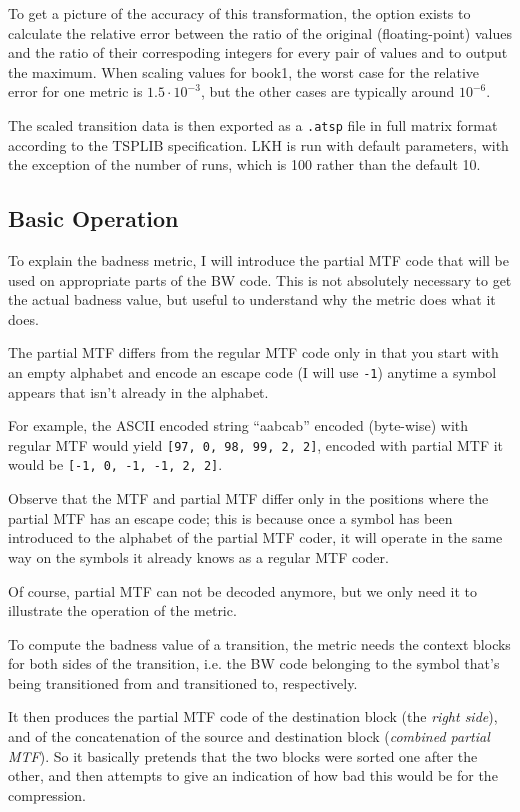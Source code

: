 \documentclass[a4paper]{scrreprt}
\begin{document}
To get a picture of the accuracy of this transformation, the option exists to
calculate the relative error between the ratio of the original (floating-point)
values and the ratio of their correspoding integers for every pair of values and
to output the maximum. When scaling values for book1, the worst case for the
relative error for one metric is \(1.5 \cdot 10^{-3}\), but the other cases are
typically around \(10^{-6}\).

The scaled transition data is then exported as a \texttt{.atsp} file in full
matrix format according to the TSPLIB specification\cite{reinelt1991tsplib}. LKH
is run with default parameters, with the exception of the number of runs, which
is 100 rather than the default 10.

\subsection{Basic Operation}

To explain the badness metric, I will introduce the partial MTF code that will
be used on appropriate parts of the BW code. This is not absolutely necessary to
get the actual badness value, but useful to understand why the metric does what
it does.

The partial MTF differs from the regular MTF code only in that you start with an
empty alphabet and encode an escape code (I will use \texttt{-1}) anytime a
symbol appears that isn't already in the alphabet.

For example, the ASCII encoded string ``aabcab'' encoded (byte-wise) with
regular MTF would yield \texttt{[97, 0, 98, 99, 2, 2]}, encoded with partial MTF
it would be \texttt{[-1, 0, -1, -1, 2, 2]}.

Observe that the MTF and partial MTF differ only in the positions where the
partial MTF has an escape code; this is because once a symbol has been
introduced to the alphabet of the partial MTF coder, it will operate in the same
way on the symbols it already knows as a regular MTF coder.

Of course, partial MTF can not be decoded anymore, but we only need it to
illustrate the operation of the metric.

To compute the badness value of a transition, the metric needs the context
blocks for both sides of the transition, i.e. the BW code belonging to the
symbol that's being transitioned from and transitioned to, respectively.

It then produces the partial MTF code of the destination block (the \emph{right
side}), and of the concatenation of the source and destination block
(\emph{combined partial MTF}). So it  basically pretends that the two blocks
were sorted one after the other, and then attempts to give an indication of how
bad this would be for the compression.
\end{document}
